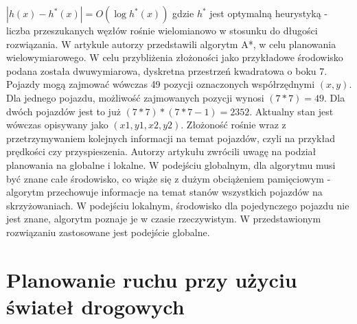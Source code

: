 \newline
\newline
\begin{math}
|h(x)-h^{*}(x)|=O(\log h^{*}(x))
\end{math}
\newline
\newline
gdzie \begin{math}h^{*}\end{math} jest optymalną heurystyką - liczba przeszukanych węzłów rośnie wielomianowo w stosunku do długości rozwiązania.
\newline
\indent
W artykule \cite{wojnicki2015robust} autorzy przedstawili algorytm A*, w celu planowania wielowymiarowego. W celu przybliżenia złożoności jako przykładowe środowisko podana została dwuwymiarowa, dyskretna przestrzeń kwadratowa o boku 7. Pojazdy mogą zajmować wówczas 49 pozycji oznaczonych współrzędnymi \begin{math}(x, y)\end{math}. Dla jednego pojazdu, możliwość zajmowanych pozycji wynosi \begin{math}(7 * 7) = 49 \end{math}. Dla dwóch pojazdów jest to już \begin{math}(7 * 7) * (7 * 7 - 1) = 2352 \end{math}. Aktualny stan jest wówczas opisywany jako \begin{math}(x1, y1, x2, y2)\end{math}. Złożoność rośnie wraz z przetrzymywaniem kolejnych informacji na temat pojazdów, czyli na przykład prędkości czy przyspieszenia.
\newline
\indent
Autorzy artykułu \cite{leena2014survey} zwrócili uwagę na podział planowania na globalne i lokalne. W podejściu globalnym, dla algorytmu musi być znane całe środowisko, co wiąże się z dużym obciążeniem pamięciowym - algorytm przechowuje informacje na temat stanów wszystkich pojazdów na skrzyżowaniach. W podejściu lokalnym, środowisko dla pojedynczego pojazdu nie jest znane, algorytm poznaje je w czasie rzeczywistym. W przedstawionym rozwiązaniu zastosowane jest podejście globalne.

\section{Planowanie ruchu przy użyciu świateł drogowych}

